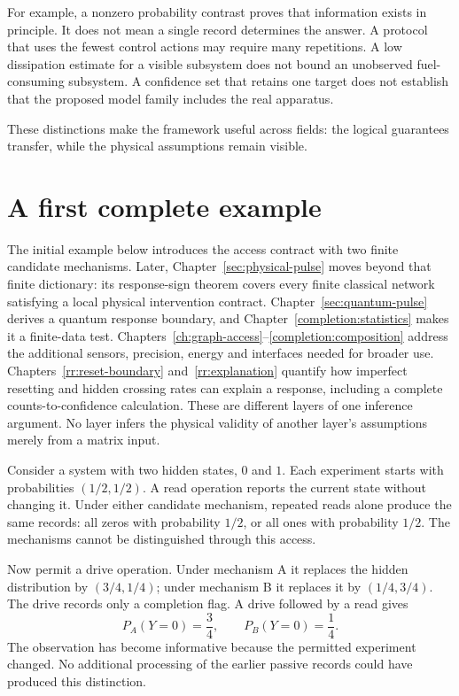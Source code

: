 For example, a nonzero probability contrast proves that information exists in principle. It does not mean a single record determines the answer. A protocol that uses the fewest control actions may require many repetitions. A low dissipation estimate for a visible subsystem does not bound an unobserved fuel-consuming subsystem. A confidence set that retains one target does not establish that the proposed model family includes the real apparatus.

These distinctions make the framework useful across fields: the logical guarantees transfer, while the physical assumptions remain visible.

\section{A first complete example}
The initial example below introduces the access contract with two finite
candidate mechanisms. Later, Chapter~\ref{sec:physical-pulse} moves beyond
that finite dictionary: its response-sign theorem covers every finite
classical network satisfying a local physical intervention contract.
Chapter~\ref{sec:quantum-pulse} derives a quantum response boundary, and
Chapter~\ref{completion:statistics} makes it a finite-data test.
Chapters~\ref{ch:graph-access}--\ref{completion:composition} address the
additional sensors, precision, energy and interfaces needed for broader use.
Chapters~\ref{rr:reset-boundary} and~\ref{rr:explanation} quantify how imperfect resetting and hidden crossing rates can explain a response, including a complete counts-to-confidence calculation. These are different layers of one inference argument. No layer infers the
physical validity of another layer's assumptions merely from a matrix input.

Consider a system with two hidden states, $0$ and $1$. Each experiment starts with probabilities $(1/2,1/2)$. A read operation reports the current state without changing it. Under either candidate mechanism, repeated reads alone produce the same records: all zeros with probability $1/2$, or all ones with probability $1/2$. The mechanisms cannot be distinguished through this access.

Now permit a drive operation. Under mechanism A it replaces the hidden distribution by $(3/4,1/4)$; under mechanism B it replaces it by $(1/4,3/4)$. The drive records only a completion flag. A drive followed by a read gives
\[
 P_A(Y=0)=\frac34,\qquad P_B(Y=0)=\frac14.
\]
The observation has become informative because the permitted experiment changed. No additional processing of the earlier passive records could have produced this distinction.


